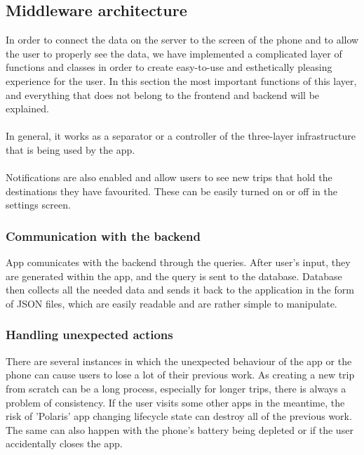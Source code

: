\subsection{Middleware architecture}
\hspace{\parindent}In order to connect the data on the server to the screen of the phone and to allow the user to properly see the data, we have implemented a complicated layer of functions and classes in order to create easy-to-use and esthetically pleasing experience for the user. In this section the most important functions of this layer, and everything that does not belong to the frontend and backend will be explained.\\ \\
In general, it works as a separator or a controller of the three-layer infrastructure that is being used by the app.\\ \\
Notifications are also enabled and allow users to see new trips that hold the destinations they have favourited. These can be easily turned on or off in the settings screen.\\
\subsubsection{Communication with the backend}
\hspace{\parindent}App comunicates with the backend through the queries. After user's input, they are generated within the app, and the query is sent to the database. Database then collects all the needed data and sends it back to the application in the form of JSON files, which are easily readable and are rather simple to manipulate. 

\subsubsection{Handling unexpected actions}
\hspace{\parindent}There are several instances in which the unexpected behaviour of the app or the phone can cause users to lose a lot of their previous work. As creating a new trip from scratch can be a long process, especially for longer trips, there is always a problem of consistency. If the user visits some other apps in the meantime, the risk of 'Polaris' app changing lifecycle state can destroy all of the previous work. The same can also happen with the phone's battery being depleted or if the user accidentally closes the app.\\ \\

